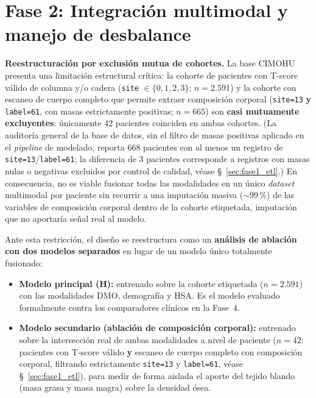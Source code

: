 \documentclass[../tesis.tex]{subfiles}
\begin{document}
\section{Fase 2: Integración multimodal y manejo de desbalance}
\label{sec:fase2_multimodal}

\textbf{Reestructuración por exclusión mutua de cohortes.} La base CIMOHU presenta una limitación estructural crítica: la cohorte de pacientes con T-score válido de columna y/o cadera (\texttt{site} $\in \{0,1,2,3\}$; $n = 2.591$) y la cohorte con escaneo de cuerpo completo que permite extraer composición corporal (\texttt{site=13} \textbf{y} \texttt{label=61}, con masas estrictamente positivas; $n = 665$) son \textbf{casi mutuamente excluyentes}: únicamente 42 pacientes coinciden en ambas cohortes. (La auditoría general de la base de datos, sin el filtro de masas positivas aplicado en el \textit{pipeline} de modelado, reporta 668 pacientes con al menos un registro de \texttt{site=13}/\texttt{label=61}; la diferencia de 3 pacientes corresponde a registros con masas nulas o negativas excluidos por control de calidad, véase §~\ref{sec:fase1_etl}.) En consecuencia, no es viable fusionar todas las modalidades en un único \textit{dataset} multimodal por paciente sin recurrir a una imputación masiva ($\sim$99\,\%) de las variables de composición corporal dentro de la cohorte etiquetada, imputación que no aportaría señal real al modelo.

Ante esta restricción, el diseño se reestructura como un \textbf{análisis de ablación con dos modelos separados} en lugar de un modelo único totalmente fusionado:
\begin{itemize}
    \item \textbf{Modelo principal (H):} entrenado sobre la cohorte etiquetada ($n = 2.591$) con las modalidades DMO, demografía y HSA. Es el modelo evaluado formalmente contra los comparadores clínicos en la Fase~4.
    \item \textbf{Modelo secundario (ablación de composición corporal):} entrenado sobre la intersección real de ambas modalidades a nivel de paciente ($n = 42$: pacientes con T-score válido \textbf{y} escaneo de cuerpo completo con composición corporal, filtrando estrictamente \texttt{site=13} y \texttt{label=61}, véase §~\ref{sec:fase1_etl}), para medir de forma aislada el aporte del tejido blando (masa grasa y masa magra) sobre la densidad ósea.
\end{itemize}
\end{document}
